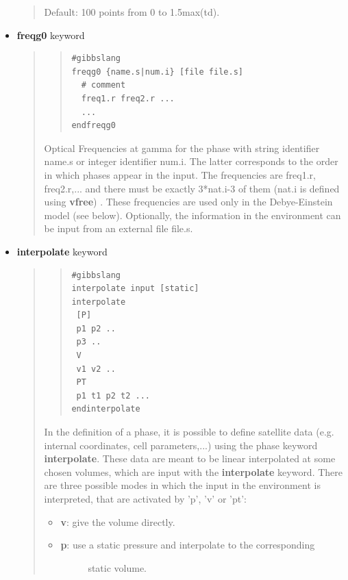 \documentclass[a4paper]{article}
\begin{document}
\begin{itemize}
\begin{quote}
Default: 100 points from 0 to 1.5max(td).

\end{quote}

\item \textbf{freqg0} keyword
%
\begin{quote}
%
\begin{quote}
\begin{verbatim}
#gibbslang
freqg0 {name.s|num.i} [file file.s]
  # comment
  freq1.r freq2.r ...
  ...
endfreqg0
\end{verbatim}
\end{quote}

Optical Frequencies at gamma for the phase with string identifier
name.s or integer identifier num.i. The latter corresponds to the
order in which phases appear in the input. The frequencies are
freq1.r, freq2.r,... and there must be exactly 3*nat.i-3 of
them (nat.i is defined using \textbf{vfree}) . These frequencies are
used only in the Debye-Einstein model (see below). Optionally, the
information in the environment can be input from an external file
file.s.

\end{quote}

\item \textbf{interpolate} keyword
%
\begin{quote}
%
\begin{quote}
\begin{verbatim}
#gibbslang
interpolate input [static]
interpolate
 [P]
 p1 p2 ..
 p3 ..
 V
 v1 v2 ..
 PT
 p1 t1 p2 t2 ...
endinterpolate
\end{verbatim}
\end{quote}

In the definition of a phase, it is possible to define satellite
data (e.g. internal coordinates, cell parameters,...) using the
phase keyword \textbf{interpolate}. These data are meant to be
linear interpolated at some chosen volumes, which are input with
the \textbf{interpolate} keyword. There are three possible modes in
which the input in the environment is interpreted, that are
activated by 'p', 'v' or 'pt':
%
\begin{itemize}

\item \textbf{v}: give the volume directly.

\item %
\begin{description}
\item[{\textbf{p}: use a static pressure and interpolate to the corresponding}] \leavevmode 
static volume.


\end{description}
\end{itemize}
\end{quote}
\end{itemize}
\end{document}
